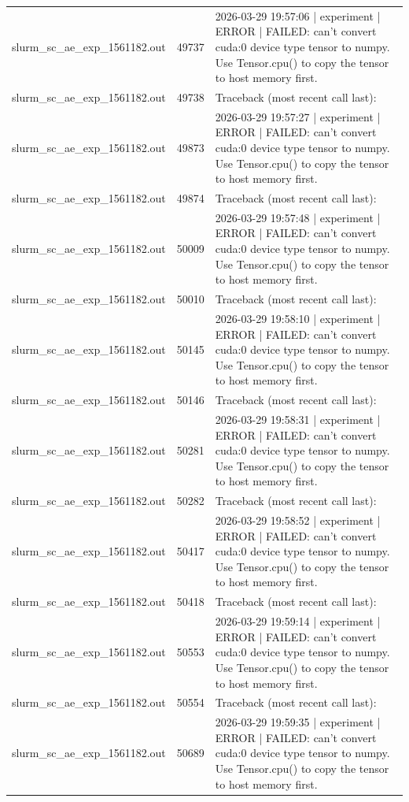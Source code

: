 \begin{tabular}{lrl}
slurm\_sc\_ae\_exp\_1561182.out & 49737 & 2026-03-29 19:57:06 | experiment | ERROR |   FAILED: can't convert cuda:0 device type tensor to numpy. Use Tensor.cpu() to copy the tensor to host memory first. \\
slurm\_sc\_ae\_exp\_1561182.out & 49738 & Traceback (most recent call last): \\
slurm\_sc\_ae\_exp\_1561182.out & 49873 & 2026-03-29 19:57:27 | experiment | ERROR |   FAILED: can't convert cuda:0 device type tensor to numpy. Use Tensor.cpu() to copy the tensor to host memory first. \\
slurm\_sc\_ae\_exp\_1561182.out & 49874 & Traceback (most recent call last): \\
slurm\_sc\_ae\_exp\_1561182.out & 50009 & 2026-03-29 19:57:48 | experiment | ERROR |   FAILED: can't convert cuda:0 device type tensor to numpy. Use Tensor.cpu() to copy the tensor to host memory first. \\
slurm\_sc\_ae\_exp\_1561182.out & 50010 & Traceback (most recent call last): \\
slurm\_sc\_ae\_exp\_1561182.out & 50145 & 2026-03-29 19:58:10 | experiment | ERROR |   FAILED: can't convert cuda:0 device type tensor to numpy. Use Tensor.cpu() to copy the tensor to host memory first. \\
slurm\_sc\_ae\_exp\_1561182.out & 50146 & Traceback (most recent call last): \\
slurm\_sc\_ae\_exp\_1561182.out & 50281 & 2026-03-29 19:58:31 | experiment | ERROR |   FAILED: can't convert cuda:0 device type tensor to numpy. Use Tensor.cpu() to copy the tensor to host memory first. \\
slurm\_sc\_ae\_exp\_1561182.out & 50282 & Traceback (most recent call last): \\
slurm\_sc\_ae\_exp\_1561182.out & 50417 & 2026-03-29 19:58:52 | experiment | ERROR |   FAILED: can't convert cuda:0 device type tensor to numpy. Use Tensor.cpu() to copy the tensor to host memory first. \\
slurm\_sc\_ae\_exp\_1561182.out & 50418 & Traceback (most recent call last): \\
slurm\_sc\_ae\_exp\_1561182.out & 50553 & 2026-03-29 19:59:14 | experiment | ERROR |   FAILED: can't convert cuda:0 device type tensor to numpy. Use Tensor.cpu() to copy the tensor to host memory first. \\
slurm\_sc\_ae\_exp\_1561182.out & 50554 & Traceback (most recent call last): \\
slurm\_sc\_ae\_exp\_1561182.out & 50689 & 2026-03-29 19:59:35 | experiment | ERROR |   FAILED: can't convert cuda:0 device type tensor to numpy. Use Tensor.cpu() to copy the tensor to host memory first. \\

\end{tabular}
